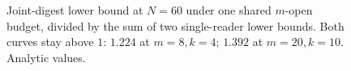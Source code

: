 \begin{figure}[H]
\caption{Joint-digest lower bound at $N=60$ under one shared $m$-open budget, divided by the sum of two single-reader lower bounds. Both curves stay above $1$: $1.224$ at $m=8,k=4$; $1.392$ at $m=20,k=10$. Analytic values.}
\label{fig:split-penalty}
\end{figure}
